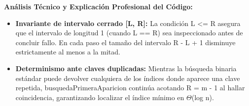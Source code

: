 \documentclass[11pt,letterpaper]{article}
\begin{document}
\noindent\textbf{\color{ipnguinda}Análisis Técnico y Explicación Profesional del Código:}\par\vspace{-2pt}
\begin{itemize}
\setlength{\itemsep}{2pt}\setlength{\parskip}{0pt}
  \item \textbf{Invariante de intervalo cerrado [L, R]: }La condición L <= R asegura que el intervalo de longitud 1 (cuando L == R) sea inspeccionado antes de concluir fallo. En cada paso el tamaño del intervalo R - L + 1 disminuye estrictamente al menos a la mitad.
  \item \textbf{Determinismo ante claves duplicadas: }Mientras la búsqueda binaria estándar puede devolver cualquiera de los índices donde aparece una clave repetida, busquedaPrimeraAparicion continúa acotando R = m - 1 al hallar coincidencia, garantizando localizar el índice mínimo en $\Theta$(log n).
\end{itemize}
\end{document}
